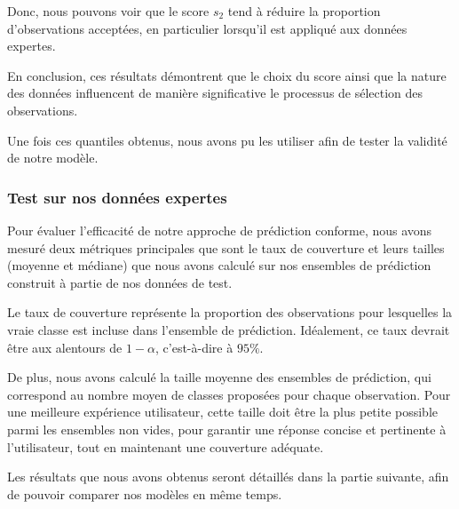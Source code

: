 \documentclass[a4paper,12pt]{article}
\begin{document}
\vspace{0.2cm}

Donc, nous pouvons voir que le score $s_2$ tend à réduire la proportion d’observations acceptées, en particulier lorsqu’il est appliqué aux données expertes.

\vspace{0.2cm}

En conclusion, ces résultats démontrent que le choix du score ainsi que la nature des données influencent de manière significative le processus de sélection des observations.

\vspace{0.2cm}

Une fois ces quantiles obtenus, nous avons pu les utiliser afin de tester la validité de notre modèle.

\subsubsection{Test sur nos données expertes}

Pour évaluer l'efficacité de notre approche de prédiction conforme, nous avons mesuré deux métriques principales que sont le taux de couverture et leurs tailles (moyenne et médiane) que nous avons calculé sur nos ensembles de prédiction construit à partie de nos données de test. 

\vspace{0.2cm}

Le taux de couverture représente la proportion des observations pour lesquelles la vraie classe est incluse dans l'ensemble de prédiction. Idéalement, ce taux devrait être aux alentours de $1- \alpha$, c'est-à-dire à $95\%$.

\vspace{0.2cm}

De plus, nous avons calculé la taille moyenne des ensembles de prédiction, qui correspond au nombre moyen de classes proposées pour chaque observation. Pour une meilleure expérience utilisateur, cette taille doit être la plus petite possible parmi les ensembles non vides, pour garantir une réponse concise et pertinente à l'utilisateur, tout en maintenant une couverture adéquate.

\vspace{0.2cm}

Les résultats que nous avons obtenus seront détaillés dans la partie suivante, afin de pouvoir comparer nos modèles en même temps.

\end{document}
